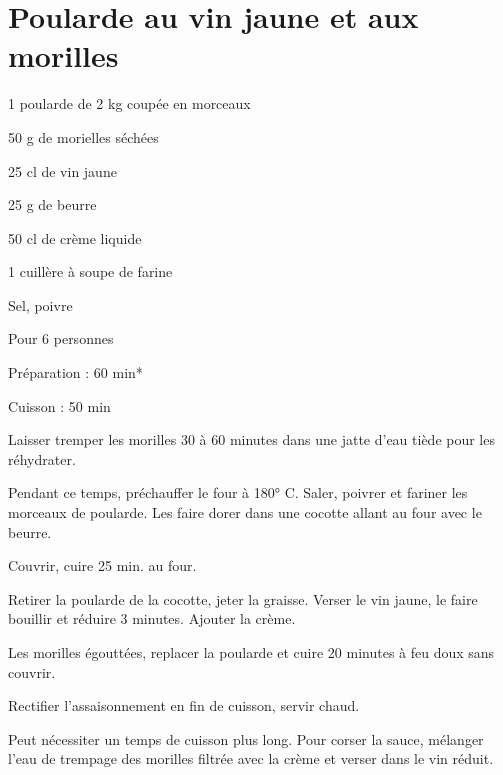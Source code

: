\section[\normalsize{Poularde au vin jaune et aux morilles}]{Poularde au vin jaune et aux morilles}

\begin{ingredients}
\item 1 poularde de 2 kg coup\'ee en morceaux
\item 50 g de morielles s\'ech\'ees
\item 25 cl de vin jaune
\item 25 g de beurre
\item 50 cl de cr\`eme liquide
\item 1 cuill\`ere \`a soupe de farine
\item Sel, poivre
\end{ingredients}
\begin{infos}
\item Pour 6 personnes
\item Préparation : 60 min*
\item Cuisson : 50 min
\end{infos}
\begin{etapes}
\item Laisser tremper les morilles 30 \`a 60 minutes dans une jatte d'eau ti\`ede pour les r\'ehydrater.
\item Pendant ce temps, pr\'echauffer le four \`a 180° C. Saler, poivrer et fariner les morceaux de poularde. Les faire dorer dans une cocotte allant au four avec le beurre. 
\item Couvrir, cuire 25 min. au four.
\item Retirer la poularde de la cocotte, jeter la graisse. Verser le vin jaune, le faire bouillir et r\'eduire 3 minutes. Ajouter la cr\`eme.
\item Les morilles \'egoutt\'ees, replacer la poularde et cuire 20 minutes \`a feu doux sans couvrir. 
\item Rectifier l'assaisonnement en fin de cuisson, servir chaud. 
\end{etapes}
\begin{conseils}
Peut n\'ecessiter un temps de cuisson plus long. Pour corser la sauce, m\'elanger l'eau de trempage des morilles filtr\'ee avec la cr\`eme et verser dans le vin r\'eduit.
\end{conseils}
